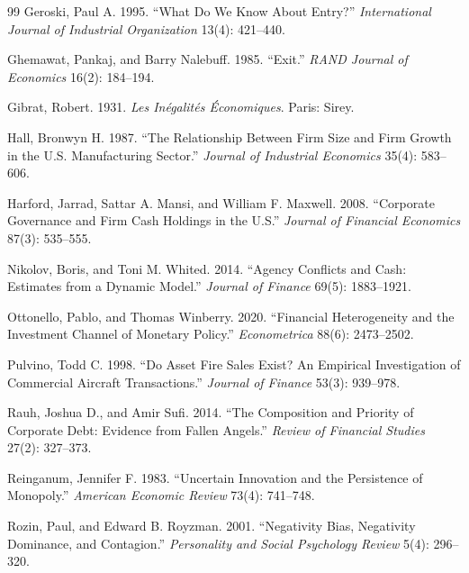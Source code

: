 \documentclass[11pt]{article}
\begin{document}
\begin{thebibliography}{99}
Geroski, Paul A. 1995. ``What Do We Know About Entry?''
\textit{International Journal of Industrial Organization} 13(4):
421--440.

Ghemawat, Pankaj, and Barry Nalebuff. 1985. ``Exit.''
\textit{RAND Journal of Economics} 16(2): 184--194.

Gibrat, Robert. 1931. \textit{Les In\'egalit\'es Économiques}.
Paris: Sirey.

Hall, Bronwyn H. 1987. ``The Relationship Between Firm Size and Firm
Growth in the U.S. Manufacturing Sector.''
\textit{Journal of Industrial Economics} 35(4): 583--606.

Harford, Jarrad, Sattar A. Mansi, and William F. Maxwell. 2008.
``Corporate Governance and Firm Cash Holdings in the U.S.''
\textit{Journal of Financial Economics} 87(3): 535--555.

Nikolov, Boris, and Toni M. Whited. 2014. ``Agency Conflicts and
Cash: Estimates from a Dynamic Model.''
\textit{Journal of Finance} 69(5): 1883--1921.

Ottonello, Pablo, and Thomas Winberry. 2020. ``Financial
Heterogeneity and the Investment Channel of Monetary Policy.''
\textit{Econometrica} 88(6): 2473--2502.

Pulvino, Todd C. 1998. ``Do Asset Fire Sales Exist? An Empirical
Investigation of Commercial Aircraft Transactions.''
\textit{Journal of Finance} 53(3): 939--978.

Rauh, Joshua D., and Amir Sufi. 2014. ``The Composition and
Priority of Corporate Debt: Evidence from Fallen Angels.''
\textit{Review of Financial Studies} 27(2): 327--373.

Reinganum, Jennifer F. 1983. ``Uncertain Innovation and the
Persistence of Monopoly.''
\textit{American Economic Review} 73(4): 741--748.

Rozin, Paul, and Edward B. Royzman. 2001. ``Negativity Bias,
Negativity Dominance, and Contagion.'' \textit{Personality and
Social Psychology Review} 5(4): 296--320.


\end{thebibliography}
\end{document}
